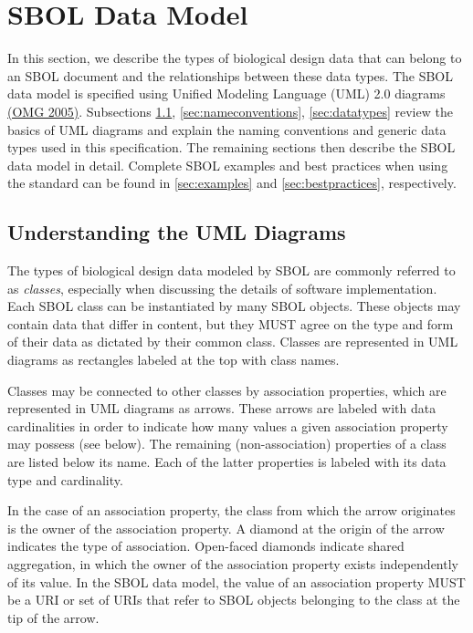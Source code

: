 \section{SBOL Data Model}\label{sec:model}


In this section, we describe the types of biological design data that can belong to an SBOL document and the relationships between these data types. The SBOL data model is specified using Unified Modeling Language (UML) 2.0 diagrams \href{http://www.omg.org/spec/UML/2.0/}{(OMG 2005)}. Subsections \ref{sec:umldiagrams}, \ref{sec:nameconventions}, \ref{sec:datatypes} review the basics of UML diagrams and explain the naming conventions and generic data types used in this specification. The remaining sections then describe the SBOL data model in detail. Complete SBOL examples and best practices when using the standard can be found in \ref{sec:examples} and \ref{sec:bestpractices}, respectively. 

\subsection{Understanding the UML Diagrams}
\label{sec:umldiagrams}

The types of biological design data modeled by SBOL are commonly referred to as {\em classes}, especially when discussing the details of software implementation. Each SBOL class can be instantiated by many SBOL objects. These objects may contain data that differ in content, but they MUST agree on the type and form of their data as dictated by their common class. Classes are represented in UML diagrams as rectangles labeled at the top with class names.

Classes may be connected to other classes by association properties, which are represented in UML diagrams as arrows. These arrows are labeled with data cardinalities in order to indicate how many values a given association property may possess (see below). The remaining (non-association) properties of a class are listed below its name. Each of the latter properties is labeled with its data type and cardinality.

In the case of an association property, the class from which the arrow originates is the owner of the association property. A diamond at the origin of the arrow indicates the type of association. Open-faced diamonds indicate shared aggregation, in which the owner of the association property exists independently of its value. In the SBOL data model, the value of an association property MUST be a URI or set of URIs that refer to SBOL objects belonging to the class at the tip of the arrow.

